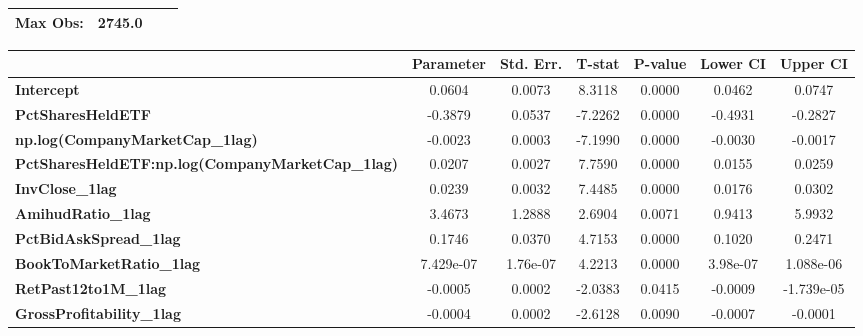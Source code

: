 \begin{center}
\begin{tabular}{lclc}
\textbf{Max Obs:}                                        &       2745.0       & \textbf{                     }   &                  \\
\bottomrule
\end{tabular}
\begin{tabular}{lcccccc}
                                                         & \textbf{Parameter} & \textbf{Std. Err.} & \textbf{T-stat} & \textbf{P-value} & \textbf{Lower CI} & \textbf{Upper CI}  \\
\midrule
\textbf{Intercept}                                       &       0.0604       &       0.0073       &      8.3118     &      0.0000      &       0.0462      &       0.0747       \\
\textbf{PctSharesHeldETF}                                &      -0.3879       &       0.0537       &     -7.2262     &      0.0000      &      -0.4931      &      -0.2827       \\
\textbf{np.log(CompanyMarketCap\_1lag)}                  &      -0.0023       &       0.0003       &     -7.1990     &      0.0000      &      -0.0030      &      -0.0017       \\
\textbf{PctSharesHeldETF:np.log(CompanyMarketCap\_1lag)} &       0.0207       &       0.0027       &      7.7590     &      0.0000      &       0.0155      &       0.0259       \\
\textbf{InvClose\_1lag}                                  &       0.0239       &       0.0032       &      7.4485     &      0.0000      &       0.0176      &       0.0302       \\
\textbf{AmihudRatio\_1lag}                               &       3.4673       &       1.2888       &      2.6904     &      0.0071      &       0.9413      &       5.9932       \\
\textbf{PctBidAskSpread\_1lag}                           &       0.1746       &       0.0370       &      4.7153     &      0.0000      &       0.1020      &       0.2471       \\
\textbf{BookToMarketRatio\_1lag}                         &     7.429e-07      &      1.76e-07      &      4.2213     &      0.0000      &      3.98e-07     &     1.088e-06      \\
\textbf{RetPast12to1M\_1lag}                             &      -0.0005       &       0.0002       &     -2.0383     &      0.0415      &      -0.0009      &     -1.739e-05     \\
\textbf{GrossProfitability\_1lag}                        &      -0.0004       &       0.0002       &     -2.6128     &      0.0090      &      -0.0007      &      -0.0001       \\

\end{tabular}
\end{center}
